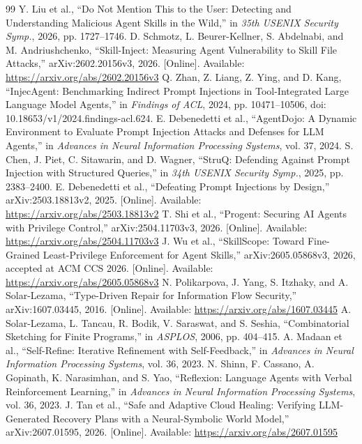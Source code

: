 \documentclass[conference]{IEEEtran}
\begin{document}
\clearpage
\begin{thebibliography}{99}
 Y. Liu et al., ``Do Not Mention This to the User: Detecting and Understanding Malicious Agent Skills in the Wild,'' in \emph{35th USENIX Security Symp.}, 2026, pp. 1727--1746.
 D. Schmotz, L. Beurer-Kellner, S. Abdelnabi, and M. Andriushchenko, ``Skill-Inject: Measuring Agent Vulnerability to Skill File Attacks,'' arXiv:2602.20156v3, 2026. [Online]. Available: \url{https://arxiv.org/abs/2602.20156v3}
 Q. Zhan, Z. Liang, Z. Ying, and D. Kang, ``InjecAgent: Benchmarking Indirect Prompt Injections in Tool-Integrated Large Language Model Agents,'' in \emph{Findings of ACL}, 2024, pp. 10471--10506, doi: 10.18653/v1/2024.findings-acl.624.
 E. Debenedetti et al., ``AgentDojo: A Dynamic Environment to Evaluate Prompt Injection Attacks and Defenses for LLM Agents,'' in \emph{Advances in Neural Information Processing Systems}, vol. 37, 2024.
 S. Chen, J. Piet, C. Sitawarin, and D. Wagner, ``StruQ: Defending Against Prompt Injection with Structured Queries,'' in \emph{34th USENIX Security Symp.}, 2025, pp. 2383--2400.
 E. Debenedetti et al., ``Defeating Prompt Injections by Design,'' arXiv:2503.18813v2, 2025. [Online]. Available: \url{https://arxiv.org/abs/2503.18813v2}
 T. Shi et al., ``Progent: Securing AI Agents with Privilege Control,'' arXiv:2504.11703v3, 2026. [Online]. Available: \url{https://arxiv.org/abs/2504.11703v3}
 J. Wu et al., ``SkillScope: Toward Fine-Grained Least-Privilege Enforcement for Agent Skills,'' arXiv:2605.05868v3, 2026, accepted at ACM CCS 2026. [Online]. Available: \url{https://arxiv.org/abs/2605.05868v3}
 N. Polikarpova, J. Yang, S. Itzhaky, and A. Solar-Lezama, ``Type-Driven Repair for Information Flow Security,'' arXiv:1607.03445, 2016. [Online]. Available: \url{https://arxiv.org/abs/1607.03445}
 A. Solar-Lezama, L. Tancau, R. Bodik, V. Saraswat, and S. Seshia, ``Combinatorial Sketching for Finite Programs,'' in \emph{ASPLOS}, 2006, pp. 404--415.
 A. Madaan et al., ``Self-Refine: Iterative Refinement with Self-Feedback,'' in \emph{Advances in Neural Information Processing Systems}, vol. 36, 2023.
 N. Shinn, F. Cassano, A. Gopinath, K. Narasimhan, and S. Yao, ``Reflexion: Language Agents with Verbal Reinforcement Learning,'' in \emph{Advances in Neural Information Processing Systems}, vol. 36, 2023.
 J. Tan et al., ``Safe and Adaptive Cloud Healing: Verifying LLM-Generated Recovery Plans with a Neural-Symbolic World Model,'' arXiv:2607.01595, 2026. [Online]. Available: \url{https://arxiv.org/abs/2607.01595}

\end{thebibliography}
\end{document}
